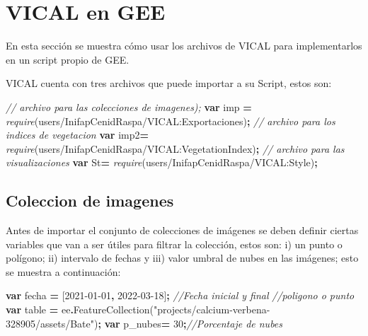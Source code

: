 \documentclass[
]{book}
\newenvironment{Shaded}{\begin{snugshade}}{\end{snugshade}}
\newcommand{\CommentTok}[1]{\textcolor[rgb]{0.56,0.35,0.01}{\textit{#1}}}
\newcommand{\DecValTok}[1]{\textcolor[rgb]{0.00,0.00,0.81}{#1}}
\newcommand{\FunctionTok}[1]{\textcolor[rgb]{0.00,0.00,0.00}{#1}}
\newcommand{\KeywordTok}[1]{\textcolor[rgb]{0.13,0.29,0.53}{\textbf{#1}}}
\newcommand{\NormalTok}[1]{#1}
\newcommand{\OperatorTok}[1]{\textcolor[rgb]{0.81,0.36,0.00}{\textbf{#1}}}
\newcommand{\PreprocessorTok}[1]{\textcolor[rgb]{0.56,0.35,0.01}{\textit{#1}}}
\newcommand{\StringTok}[1]{\textcolor[rgb]{0.31,0.60,0.02}{#1}}
\begin{document}
\hypertarget{vical-en-gee}{%
\chapter{VICAL en GEE}\label{vical-en-gee}}

En esta sección se muestra cómo usar los archivos de VICAL para implementarlos en un script propio de GEE.

VICAL cuenta con tres archivos que puede importar a su Script, estos son:

\begin{Shaded}
\begin{Highlighting}[]
\CommentTok{// archivo para las colecciones de imagenes);}
\KeywordTok{var}\NormalTok{ imp }\OperatorTok{=} \PreprocessorTok{require}\NormalTok{(}\StringTok{\textquotesingle{}users/InifapCenidRaspa/VICAL:Exportaciones\textquotesingle{}}\NormalTok{)}\OperatorTok{;}
\CommentTok{// archivo para los indices de vegetacion}
\KeywordTok{var}\NormalTok{ imp2}\OperatorTok{=} \PreprocessorTok{require}\NormalTok{(}\StringTok{\textquotesingle{}users/InifapCenidRaspa/VICAL:VegetationIndex\textquotesingle{}}\NormalTok{)}\OperatorTok{;} 
\CommentTok{// archivo para las visualizaciones}
\KeywordTok{var}\NormalTok{ St}\OperatorTok{=} \PreprocessorTok{require}\NormalTok{(}\StringTok{\textquotesingle{}users/InifapCenidRaspa/VICAL:Style\textquotesingle{}}\NormalTok{)}\OperatorTok{;}
\end{Highlighting}
\end{Shaded}

\hypertarget{CImg}{%
\section{Coleccion de imagenes}\label{CImg}}

Antes de importar el conjunto de colecciones de imágenes se deben definir ciertas variables que van a ser útiles para filtrar la colección, estos son: i) un punto o polígono; ii) intervalo de fechas y iii) valor umbral de nubes en las imágenes; esto se muestra a continuación:

\begin{Shaded}
\begin{Highlighting}[]
\KeywordTok{var}\NormalTok{ fecha }\OperatorTok{=}\NormalTok{ [}\StringTok{\textquotesingle{}2021{-}01{-}01\textquotesingle{}}\OperatorTok{,} \StringTok{\textquotesingle{}2022{-}03{-}18\textquotesingle{}}\NormalTok{]}\OperatorTok{;} \CommentTok{//Fecha inicial y final }
\CommentTok{//poligono o punto}
\KeywordTok{var}\NormalTok{ table }\OperatorTok{=}\NormalTok{ ee}\OperatorTok{.}\FunctionTok{FeatureCollection}\NormalTok{(}\StringTok{"projects/calcium{-}verbena{-}328905/assets/Bate"}\NormalTok{)}\OperatorTok{;} 
\KeywordTok{var}\NormalTok{ p\_nubes}\OperatorTok{=} \DecValTok{30}\OperatorTok{;}\CommentTok{//Porcentaje de nubes}
\end{Highlighting}
\end{Shaded}
\end{document}

